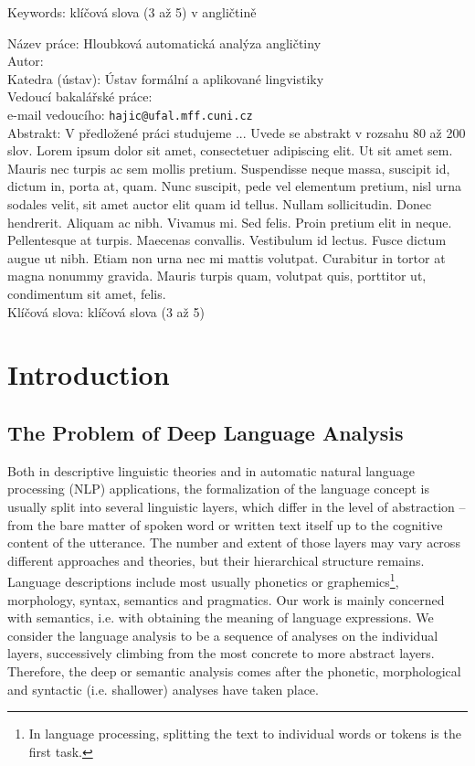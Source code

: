 \documentclass[12pt,notitlepage]{report}
\begin{document}
\noindent Keywords: klíčová slova (3 až 5) v angličtině

\vspace{10mm}
\noindent
Název práce: Hloubková automatická analýza angličtiny\\
Autor: \theauthor\\
Katedra (ústav): Ústav formální a aplikované lingvistiky\\
Vedoucí bakalářské práce: \thesupervisor\\
e-mail vedoucího: \texttt{hajic@ufal.mff.cuni.cz}\\

\noindent Abstrakt:  V předložené práci studujeme ... Uvede se abstrakt v rozsahu 80 až 200 slov. Lorem ipsum dolor sit amet, consectetuer adipiscing elit. Ut sit amet sem. Mauris nec turpis ac sem mollis pretium. Suspendisse neque massa, suscipit id, dictum in, porta at, quam. Nunc suscipit, pede vel elementum pretium, nisl urna sodales velit, sit amet auctor elit quam id tellus. Nullam sollicitudin. Donec hendrerit. Aliquam ac nibh. Vivamus mi. Sed felis. Proin pretium elit in neque. Pellentesque at turpis. Maecenas convallis. Vestibulum id lectus. Fusce dictum augue ut nibh. Etiam non urna nec mi mattis volutpat. Curabitur in tortor at magna nonummy gravida. Mauris turpis quam, volutpat quis, porttitor ut, condimentum sit amet, felis.\\

\noindent Klíčová slova: klíčová slova (3 až 5)


\cleardoublepage

%
%
\chapter{Introduction}\label{intro}
%
%

\section{The Problem of Deep Language Analysis}\label{problem}

Both in descriptive linguistic theories and in automatic natural language processing (NLP) applications, the formalization of the language concept is usually split into several linguistic layers, which differ in the level of abstraction -- from the bare matter of spoken word or written text itself up to the cognitive content of the utterance. The number and extent of those layers may vary across different approaches and theories, but their hierarchical structure remains. Language descriptions include most usually phonetics or graphemics\footnote{In language processing, splitting the text to individual words or tokens is the first task.}, morphology, syntax, semantics and pragmatics. Our work is mainly concerned with semantics, i.e. with obtaining the meaning of language expressions. We consider the language analysis to be a sequence of analyses on the individual layers, successively climbing from the most concrete to more abstract layers. Therefore, the deep or semantic analysis comes after the phonetic, morphological and syntactic (i.e. shallower) analyses have taken place.
\end{document}
